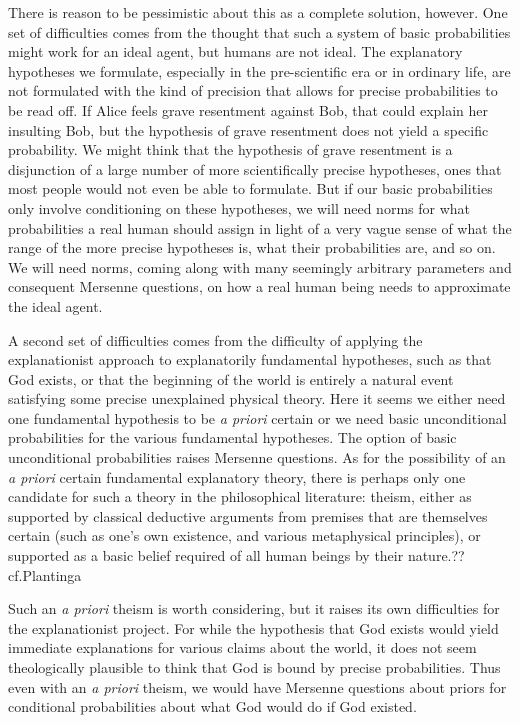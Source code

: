 There is reason to be pessimistic about this as a complete solution, however. One set of difficulties comes
from the thought that such a system of basic probabilities might work for an ideal agent, but humans are not
ideal. The explanatory hypotheses we formulate, especially in the pre-scientific era or in ordinary life, are not formulated
with the kind of precision that allows for precise probabilities to be read off. If Alice feels grave resentment against
Bob, that could explain her insulting Bob, but the hypothesis of grave resentment does not yield a specific 
probability. We might think that the hypothesis of grave resentment is a disjunction of a large
number of more scientifically precise hypotheses, ones that most people would not even be able to formulate. 
But if our basic probabilities only involve conditioning on these hypotheses, we will need norms for what probabilities 
a real human should assign in light of a very vague sense of what the range of the more precise hypotheses is,
what their probabilities are, and so on. We will need norms, coming along with many seemingly arbitrary parameters
and consequent Mersenne questions, on how a real human being needs to approximate the ideal agent.

A second set of difficulties comes from the difficulty of applying the explanationist approach to explanatorily 
fundamental hypotheses, such as that God exists, or that the beginning of the world is entirely a natural event 
satisfying some precise unexplained physical theory. Here it seems we either need one fundamental hypothesis to be 
\textit{a priori} certain or we need basic unconditional probabilities for the various fundamental hypotheses. 
The option of basic unconditional probabilities raises Mersenne questions. As for the possibility of 
an \textit{a priori} certain fundamental explanatory theory, there is perhaps only one candidate for such a 
theory in the philosophical literature: theism, either as supported by classical deductive arguments from
premises that are themselves certain (such as one's own existence, and various metaphysical principles), or 
supported as a basic belief required of all human beings by their nature.??cf.Plantinga 

Such an \textit{a 
priori} theism is worth considering, but it raises its own difficulties for the explanationist project. For 
while the hypothesis that God exists would yield immediate explanations for various claims about the world,
it does not seem theologically plausible to think that God is bound by precise probabilities. Thus even with 
an \textit{a priori} theism, we would have Mersenne questions about priors for conditional probabilities about
what God would do if God existed.

